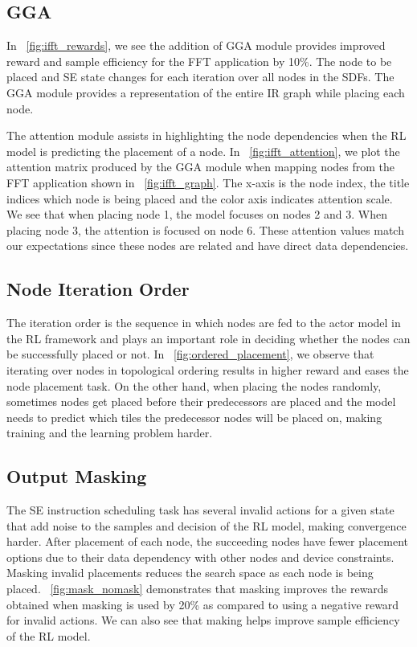 \subsection{GGA} \label{sec:GGA_result}

In \figurename~\ref{fig:ifft_rewards}, we see the addition of GGA module provides improved reward and sample efficiency for the FFT application by 10\%. 
The node to be placed and SE state changes for each iteration over all nodes in the SDFs. The GGA module provides a representation of the entire IR graph while placing each node.

The attention module assists in highlighting the node dependencies when the RL model is predicting the placement of a node. 
In \figurename~\ref{fig:ifft_attention}, we plot the attention matrix produced by the GGA module when mapping nodes from the FFT application shown in \figurename~\ref{fig:ifft_graph}. 
The x-axis is the node index, the title indices which node is being placed and the color axis indicates attention scale.
We see that when placing node 1, the model focuses on nodes 2 and 3. When placing node 3, the attention is focused on node 6.
These attention values match our expectations since these nodes are related and have direct data dependencies. 

\subsection{Node Iteration Order}

The iteration order is the sequence in which nodes are fed to the actor model in the RL framework and plays an important role in deciding whether the nodes can be successfully placed or not. 
In \figurename~\ref{fig:ordered_placement}, we observe that iterating over nodes in topological ordering results in higher reward and eases the node placement task. 
On the other hand, when placing the nodes randomly, sometimes nodes get placed before their predecessors are placed and the model needs to predict which tiles the predecessor nodes will be placed on, making training and the learning problem harder.

\subsection{Output Masking}
\label{subsec:output_masking}
The SE instruction scheduling task has several invalid actions for a given state that add noise to the samples and decision of the RL model, making convergence harder. 
After placement of each node, the succeeding nodes have fewer placement options due to their data dependency with other nodes and device constraints.
Masking invalid placements reduces the search space as each node is being placed. 
\figurename~\ref{fig:mask_nomask} demonstrates that masking improves the rewards obtained when masking is used by 20\% as compared to using a negative reward for invalid actions. We can also see that making helps improve sample efficiency of the RL model.

